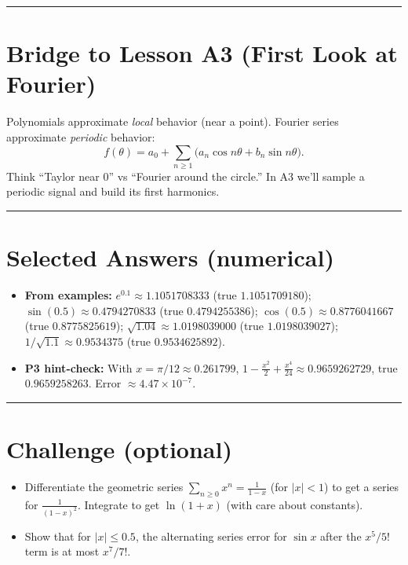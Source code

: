 \documentclass[11pt]{article}
\begin{document}
\bigskip\hrule\bigskip

\section*{Bridge to Lesson A3 (First Look at Fourier)}
Polynomials approximate \emph{local} behavior (near a point). Fourier series approximate \emph{periodic} behavior:
\[
f(\theta)=a_0+\sum_{n\ge1}\big(a_n\cos n\theta+b_n\sin n\theta\big).
\]
Think “Taylor near \(0\)” vs “Fourier around the circle.” In A3 we’ll sample a periodic signal and build its first harmonics.

\bigskip\hrule\bigskip

\section*{Selected Answers (numerical)}
\begin{itemize}
  \item \textbf{From examples:} \(e^{0.1}\approx 1.1051708333\) (true \(1.1051709180\)); \(\sin(0.5)\approx 0.4794270833\) (true \(0.4794255386\)); \(\cos(0.5)\approx 0.8776041667\) (true \(0.8775825619\)); \(\sqrt{1.04}\approx 1.0198039000\) (true \(1.0198039027\)); \(1/\sqrt{1.1}\approx 0.9534375\) (true \(0.9534625892\)).
  \item \textbf{P3 hint-check:} With \(x=\pi/12\approx 0.261799\), \(1-\tfrac{x^2}{2}+\tfrac{x^4}{24}\approx 0.9659262729\), true \(0.9659258263\). Error \(\approx 4.47\times10^{-7}\).
\end{itemize}

\bigskip\hrule\bigskip

\section*{Challenge (optional)}
\begin{itemize}
  \item Differentiate the geometric series \(\sum_{n\ge0}x^n=\frac{1}{1-x}\) (for \(|x|<1\)) to get a series for \(\frac{1}{(1-x)^2}\). Integrate to get \(\ln(1+x)\) (with care about constants).
  \item Show that for \(|x|\le 0.5\), the alternating series error for \(\sin x\) after the \(x^5/5!\) term is at most \(x^7/7!\).
\end{itemize}
\end{document}
